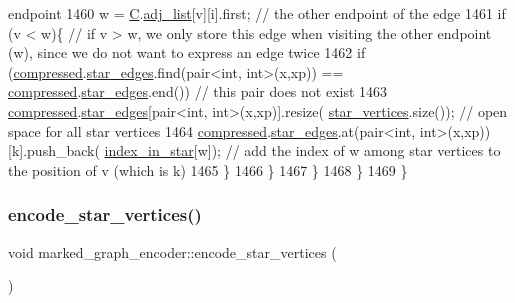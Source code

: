 \begin{DoxyCode}
{       endpoint}
1460         w = \hyperlink{classmarked__graph__encoder_af82bc0653414091291cb75553a407bdb}{C}.\hyperlink{classcolored__graph_a45dce16965079286cf3f41a54a1b2ea4}{adj\_list}[v][i].first; \textcolor{comment}{// the other endpoint of the edge}
1461         \textcolor{keywordflow}{if} (v < w)\{ \textcolor{comment}{// if v > w, we only store this edge when visiting the other endpoint (w), since we do
       not want to express an edge twice}
1462           \textcolor{keywordflow}{if} (\hyperlink{classmarked__graph__encoder_ac2ded200860fdd2321f86dd76b28bcb3}{compressed}.\hyperlink{classmarked__graph__compressed_a7df5779d313486644132bd816937f532}{star\_edges}.find(pair<int, int>(x,xp)) == 
      \hyperlink{classmarked__graph__encoder_ac2ded200860fdd2321f86dd76b28bcb3}{compressed}.\hyperlink{classmarked__graph__compressed_a7df5779d313486644132bd816937f532}{star\_edges}.end()) \textcolor{comment}{// this pair does not exist}
1463             \hyperlink{classmarked__graph__encoder_ac2ded200860fdd2321f86dd76b28bcb3}{compressed}.\hyperlink{classmarked__graph__compressed_a7df5779d313486644132bd816937f532}{star\_edges}[pair<int, int>(x,xp)].resize(
      \hyperlink{classmarked__graph__encoder_a08fdf6fcd7dcd8c5d1667f2d7ff06c2c}{star\_vertices}.size()); \textcolor{comment}{// open space for all star vertices }
1464           \hyperlink{classmarked__graph__encoder_ac2ded200860fdd2321f86dd76b28bcb3}{compressed}.\hyperlink{classmarked__graph__compressed_a7df5779d313486644132bd816937f532}{star\_edges}.at(pair<int, int>(x,xp))[k].push\_back(
      \hyperlink{classmarked__graph__encoder_ac3cc1cb565e72a53d35360891f990aa9}{index\_in\_star}[w]); \textcolor{comment}{// add the index of w among star vertices to the position of v (which is k)}
1465         \}
1466       \}
1467     \}
1468   \}
1469 \}
\end{DoxyCode}
\mbox{\label{classmarked__graph__encoder_af8daeed1452dbfd41fa2f875813e3496}} 
\subsubsection{\texorpdfstring{encode\+\_\+star\+\_\+vertices()}{encode\_star\_vertices()}}
{\footnotesize\ttfamily void marked\+\_\+graph\+\_\+encoder\+::encode\+\_\+star\+\_\+vertices (\begin{DoxyParamCaption}{ }\end{DoxyParamCaption})\hspace{0.3cm}{\ttfamily [private]}}



